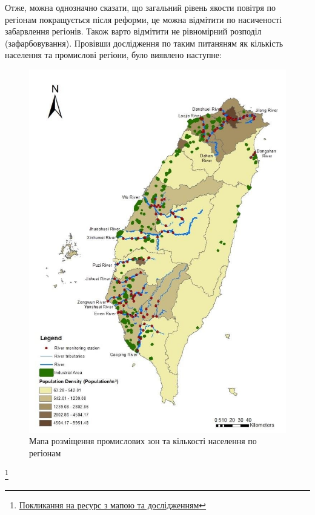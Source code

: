 \documentclass{article}
\begin{document}
\begin{enumerate}
    Отже, можна однозначно сказати, що загальний рівень якости повітря по регіонам покращується після реформи, це можна відмітити по насиченості забарвлення регіонів. 
    Також варто відмітити не рівномірний розподіл (зафарбовування). Провівши дослідження по таким питаняням як кількість населення та промислові регіони, було виявлено наступне: 
    \begin{figure}
        \centering
        \includegraphics[width=6in]{../../notes/media/Study-area-of-Taiwan-representative-rivers-population-density-and-industrial-area-map.png}
        \caption{Мапа розміщення промислових зон та кількості населення по регіонам}
        \label{fig:map_after_reform}
    \end{figure}
    \footnote{\href{https://www.researchgate.net/figure/Study-area-of-Taiwan-representative-rivers-population-density-and-industrial-area-map_fig1_327245998}{Покликання на ресурс з мапою та дослідженням}}
    


\end{enumerate}
\end{document}
